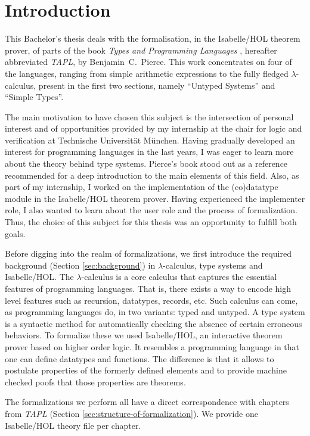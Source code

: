 \section{Introduction}

This Bachelor's thesis deals with the formalisation, in the Isabelle/HOL theorem prover, of parts of
the book \emph{Types and Programming Languages} \cite{pierce-2002-TAPL}, hereafter abbreviated
\emph{TAPL}, by Benjamin~C.~Pierce. This work concentrates on four of the languages, ranging from
simple arithmetic expressions to the fully fledged $\lambda$-calculus, present in the first two
sections, namely ``Untyped Systems'' and ``Simple Types''.

The main motivation to have chosen this subject is the intersection of personal interest and of
opportunities provided by my internship at the chair for logic and verification at Technische
Universität München. Having gradually developed an interest for programming languages in the last
years, I was eager to learn more about the theory behind type systems. Pierce's book stood out as
a reference recommended for a deep introduction to the main elements of this field. Also, as part of
my internship, I worked on the implementation of the (co)datatype module in the Isabelle/HOL
theorem prover. Having experienced the implementer role, I also wanted to learn about the user
role and the process of formalization. Thus, the choice of this subject for this thesis was an
opportunity to fulfill both goals.

Before digging into the realm of formalizations, we first introduce the required background (Section
\ref{sec:background}) in $\lambda$-calculus, type systems and Isabelle/HOL. The $\lambda$-calculus
is a core calculus that captures the essential features of programming languages. That is, there
exists a way to encode high level features such as recursion, datatypes, records, etc. Such calculus
can come, as programming languages do, in two variants: typed and untyped. A type system is a
syntactic method for automatically checking the absence of certain erroneous behaviors. To formalize
these we used Isabelle/HOL, an interactive theorem prover based on higher order logic. It resembles
a programming language in that one can define datatypes and functions. The difference is that it
allows to postulate properties of the formerly defined elements and to provide machine checked poofs
that those properties are theorems.

The formalizations we perform all have a direct correspondence with chapters from \emph{TAPL}
(Section \ref{sec:structure-of-formalization}). We provide one Isabelle/HOL theory file per chapter.

